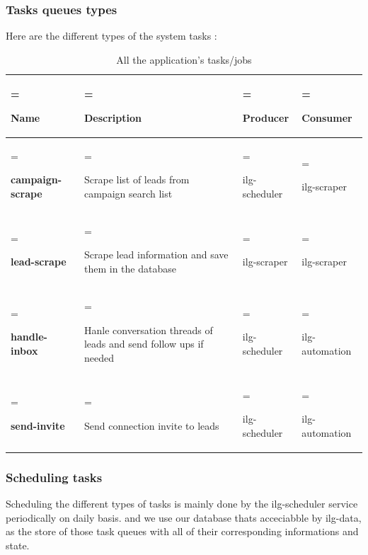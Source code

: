 \subsubsection{Tasks queues types}
Here are the different types of the system tasks :
\begin{table}[H]
	\renewcommand{\arraystretch}{1.5}%
	\caption{All the application's tasks/jobs}
	\centering
	\medskip
	\begin{tabularx}{1\textwidth} {
			| >{\hsize=1.2\hsize\linewidth=\hsize\raggedright\arraybackslash}X
			| >{\hsize=1.2\hsize\linewidth=\hsize\raggedright\arraybackslash}X
			| >{\hsize=0.8\hsize\linewidth=\hsize\raggedright\arraybackslash}X
			| >{\hsize=0.8\hsize\linewidth=\hsize\raggedright\arraybackslash}X |}
		\hline
		\rowcolor{primary} \textbf {Name} & \textbf {Description}                                             & \textbf {Producer} & \textbf {Consumer} \\
		\hline
		\textbf {campaign-scrape}         & Scrape list of leads from campaign search list                    & ilg-scheduler      & ilg-scraper        \\
		\hline
		\textbf {lead-scrape}             & Scrape lead information and save them in the database             & ilg-scraper        & ilg-scraper        \\
		\hline
		\textbf {handle-inbox}            & Hanle conversation threads of leads and send follow ups if needed & ilg-scheduler      & ilg-automation     \\
		\hline
		\textbf {send-invite}             & Send connection invite to leads                                   & ilg-scheduler      & ilg-automation     \\
		\hline
	\end{tabularx}
\end{table}
\newpage
\subsubsection{Scheduling tasks}
Scheduling the different types of tasks is mainly done by the ilg-scheduler service periodically on daily basis. and we use our database thats acceciabble by ilg-data, as the store of those task queues with all of their corresponding informations and state. 
\linebreak
{}
\newpage

